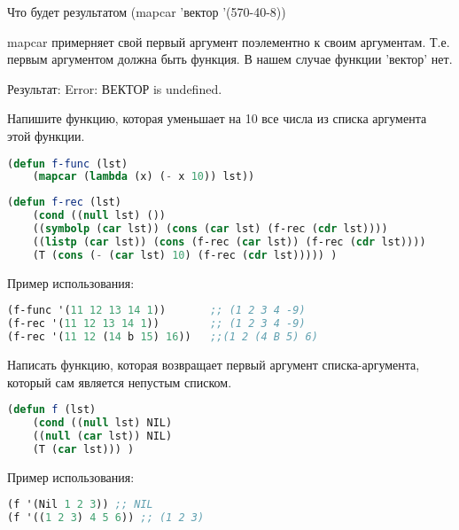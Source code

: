 \documentclass[a4paper,oneside,12pt]{extreport}
\begin{document}
\begin{task}
    Что будет результатом (mapcar 'вектор '(570-40-8))

    mapcar примерняет свой первый аргумент поэлементно к своим аргументам.
    Т.е. первым аргументом должна быть функция. В нашем случае функции 'вектор' нет. 

    Результат: Error: ВЕКТОР is undefined.
\end{task}


\begin{task}
    Напишите функцию, которая уменьшает на 10 все числа из списка аргумента этой функции.

    \begin{lstlisting}[language=Lisp]
(defun f-func (lst)
    (mapcar (lambda (x) (- x 10)) lst))
    \end{lstlisting}

    \begin{lstlisting}[language=Lisp]
(defun f-rec (lst)
    (cond ((null lst) ())
    ((symbolp (car lst)) (cons (car lst) (f-rec (cdr lst))))
    ((listp (car lst)) (cons (f-rec (car lst)) (f-rec (cdr lst))))
    (T (cons (- (car lst) 10) (f-rec (cdr lst))))) )    
    \end{lstlisting}

    Пример использования:
    \begin{lstlisting}[language=Lisp]  
(f-func '(11 12 13 14 1))       ;; (1 2 3 4 -9)  
(f-rec '(11 12 13 14 1))        ;; (1 2 3 4 -9)
(f-rec '(11 12 (14 b 15) 16))   ;;(1 2 (4 B 5) 6)
    \end{lstlisting}
\end{task}

\begin{task}
    Написать функцию, которая возвращает первый аргумент
    списка-аргумента, который сам является непустым списком.

    \begin{lstlisting}[language=Lisp]
(defun f (lst)
	(cond ((null lst) NIL)
	((null (car lst)) NIL)
	(T (car lst))) )
    \end{lstlisting}

    Пример использования:
    \begin{lstlisting}[language=Lisp]    
(f '(Nil 1 2 3)) ;; NIL
(f '((1 2 3) 4 5 6)) ;; (1 2 3)
    \end{lstlisting}
\end{task}
    
\end{document}
